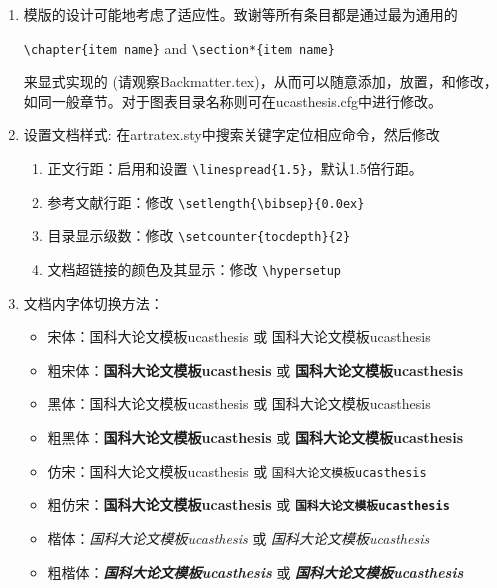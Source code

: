 \begin{enumerate}
            \item 模版的设计可能地考虑了适应性。致谢等所有条目都是通过最为通用的

                \verb+\chapter{item name}+  and \verb+\section*{item name}+

                来显式实现的 (请观察Backmatter.tex)，从而可以随意添加，放置，和修改，如同一般章节。对于图表目录名称则可在ucasthesis.cfg中进行修改。

            \item 设置文档样式: 在artratex.sty中搜索关键字定位相应命令，然后修改
                \begin{enumerate}
                        \item 正文行距：启用和设置 \verb|\linespread{1.5}|，默认1.5倍行距。
                        \item 参考文献行距：修改 \verb|\setlength{\bibsep}{0.0ex}|
                        \item 目录显示级数：修改 \verb|\setcounter{tocdepth}{2}|
                        \item 文档超链接的颜色及其显示：修改 \verb|\hypersetup|
                \end{enumerate}

            \item 文档内字体切换方法：
                \begin{itemize}
                    \item 宋体：国科大论文模板ucasthesis 或 \textrm{国科大论文模板ucasthesis}
                    \item 粗宋体：{\bfseries 国科大论文模板ucasthesis} 或 \textbf{国科大论文模板ucasthesis}
                    \item 黑体：{\sffamily 国科大论文模板ucasthesis} 或 \textsf{国科大论文模板ucasthesis}
                    \item 粗黑体：{\bfseries\sffamily 国科大论文模板ucasthesis} 或 \textsf{\bfseries 国科大论文模板ucasthesis}
                    \item 仿宋：{\ttfamily 国科大论文模板ucasthesis} 或 \texttt{国科大论文模板ucasthesis}
                    \item 粗仿宋：{\bfseries\ttfamily 国科大论文模板ucasthesis} 或 \texttt{\bfseries 国科大论文模板ucasthesis}
                    \item 楷体：{\itshape 国科大论文模板ucasthesis} 或 \textit{国科大论文模板ucasthesis}
                    \item 粗楷体：{\bfseries\itshape 国科大论文模板ucasthesis} 或 \textit{\bfseries 国科大论文模板ucasthesis}
                \end{itemize}


\end{enumerate}
